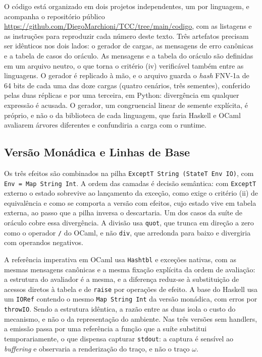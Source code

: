 \documentclass[12pt]{article}
\begin{document}
O código está organizado em dois projetos independentes, um por linguagem, e
acompanha o repositório público
\url{https://github.com/DiegoMarchioni/TCC/tree/main/codigo}, com as listagens
e as instruções para reproduzir cada número deste texto. Três artefatos precisam ser idênticos nos dois
lados: o gerador de cargas, as mensagens de erro canônicas e a tabela de casos
do oráculo. As mensagens e a tabela do oráculo são definidas em um
arquivo neutro, o que torna o critério (iv) verificável também entre
as linguagens. O gerador é replicado à mão, e o arquivo guarda o
\textit{hash} FNV-1a de 64 bits de cada uma das doze cargas (quatro cenários,
três sementes), conferido pelas duas réplicas e por uma terceira, em Python:
divergência em qualquer expressão é acusada. O gerador, um congruencial
linear de semente explícita, é próprio, e não o da biblioteca de cada
linguagem, que faria Haskell e OCaml avaliarem árvores diferentes e confundiria
a carga com o runtime.

\subsection{Versão Monádica e Linhas de Base}\label{sec:impl-monadica}

Os três efeitos são combinados na pilha \texttt{ExceptT String (StateT Env
IO)}, com \texttt{Env = Map String Int}. A ordem das camadas é decisão
semântica: com \texttt{ExceptT} externo o estado sobrevive ao lançamento da
exceção, como exige o critério (ii) de equivalência e como se comporta a versão
com efeitos, cujo estado vive em tabela externa, ao passo que a pilha inversa o
descartaria. Um dos casos da suíte de oráculo cobre essa divergência. A
divisão usa \texttt{quot}, que trunca em direção a zero como o operador
\texttt{/} do OCaml, e não \texttt{div}, que
arredonda para baixo e divergiria com operandos negativos.

A referência imperativa em OCaml usa \texttt{Hashtbl} e exceções nativas, com
as mesmas mensagens canônicas e a mesma fixação explícita
da ordem de avaliação: a estrutura do avaliador é a mesma, e a diferença
reduz-se à substituição de acessos diretos à tabela e de \texttt{raise} por
operações de efeito. A base do Haskell usa um \texttt{IORef} contendo o mesmo
\texttt{Map String Int} da versão monádica, com erros por \texttt{throwIO}.
Sendo a estrutura idêntica, a razão entre as duas isola o custo do mecanismo,
e não o da representação do ambiente. Nas três versões sem handlers,
a emissão passa por uma referência a função que a suíte substitui temporariamente, o que dispensa
capturar \texttt{stdout}: a captura é sensível ao \textit{buffering} e
observaria a renderização do traço, e não o traço $\omega$.
\end{document}
